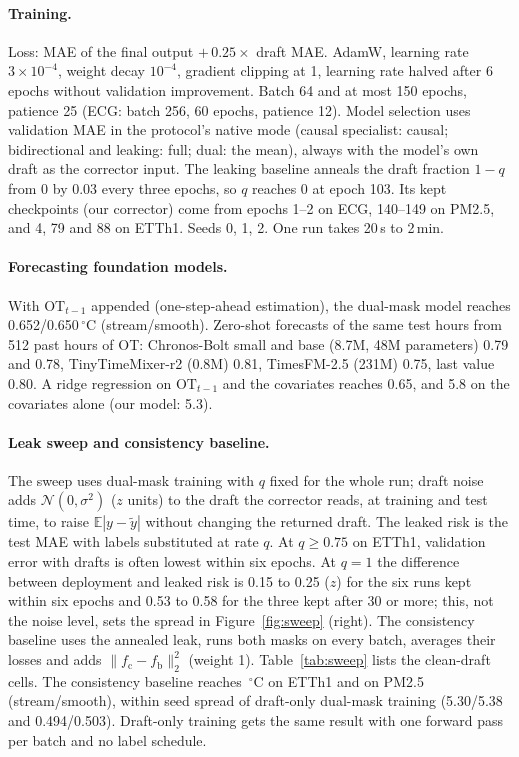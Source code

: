 \documentclass{article}
\begin{document}
\paragraph{Training.} Loss: MAE of the final output $+\,0.25\times$ draft MAE. AdamW, learning rate $3\times10^{-4}$, weight decay $10^{-4}$, gradient clipping at 1, learning rate halved after 6 epochs without validation improvement. Batch 64 and at most 150 epochs, patience 25 (ECG: batch 256, 60 epochs, patience 12). Model selection uses validation MAE in the protocol's native mode (causal specialist: causal; bidirectional and leaking: full; dual: the mean), always with the model's own draft as the corrector input. The leaking baseline anneals the draft fraction $1-q$ from 0 by 0.03 every three epochs, so $q$ reaches 0 at epoch 103. Its kept checkpoints (our corrector) come from epochs 1--2 on ECG, 140--149 on PM2.5, and 4, 79 and 88 on ETTh1. Seeds 0, 1, 2. One run takes 20\,s to 2\,min.
\paragraph{Forecasting foundation models.} With $\mathrm{OT}_{t-1}$ appended (one-step-ahead estimation), the dual-mask model reaches 0.652/0.650\,$^\circ$C (stream/smooth). Zero-shot forecasts of the same test hours from 512 past hours of OT: Chronos-Bolt small and base (8.7M, 48M parameters) 0.79 and 0.78, TinyTimeMixer-r2 (0.8M) 0.81, TimesFM-2.5 (231M) 0.75, last value 0.80. A ridge regression on $\mathrm{OT}_{t-1}$ and the covariates reaches 0.65, and 5.8 on the covariates alone (our model: 5.3).
\paragraph{Leak sweep and consistency baseline.} The sweep uses dual-mask training with $q$ fixed for the whole run; draft noise adds $\mathcal N(0,\sigma^2)$ ($z$ units) to the draft the corrector reads, at training and test time, to raise $\mathbb{E}|y-\tilde y|$ without changing the returned draft. The leaked risk is the test MAE with labels substituted at rate $q$. At $q\ge0.75$ on ETTh1, validation error with drafts is often lowest within six epochs. At $q{=}1$ the difference between deployment and leaked risk is 0.15 to 0.25 ($z$) for the six runs kept within six epochs and 0.53 to 0.58 for the three kept after 30 or more; this, not the noise level, sets the spread in Figure~\ref{fig:sweep} (right). The consistency baseline uses the annealed leak, runs both masks on every batch, averages their losses and adds $\|f_\mathrm{c}-f_\mathrm{b}\|_2^2$ (weight 1). Table~\ref{tab:sweep} lists the clean-draft cells. The consistency baseline reaches \ConsEtt\,$^\circ$C on ETTh1 and \ConsAir{} on PM2.5 (stream/smooth), within seed spread of draft-only dual-mask training (5.30/5.38 and 0.494/0.503). Draft-only training gets the same result with one forward pass per batch and no label schedule.
\end{document}
